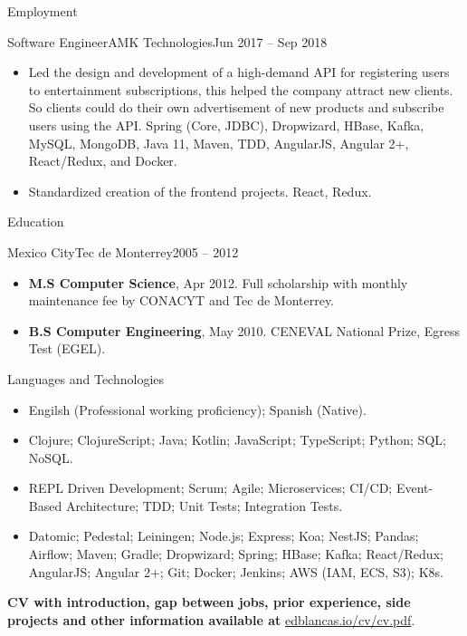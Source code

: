 \documentclass[calibri]{../macdowell-cv/mcdowellcv}
\begin{document}
\begin{cvsection}{Employment}
		\begin{cvsubsection}{Software Engineer}{AMK Technologies}{Jun 2017 -- Sep 2018}
			\begin{itemize}
				\item Led the design and development of a high-demand API for registering users to entertainment subscriptions, this helped the company attract new clients. So clients could do their own advertisement of new products and subscribe users using the API. Spring (Core, JDBC), Dropwizard, HBase, Kafka, MySQL, MongoDB, Java 11, Maven, TDD, AngularJS, Angular 2+, React/Redux, and Docker.
				\item Standardized creation of the frontend projects. React, Redux.
			\end{itemize}
		\end{cvsubsection}
	\end{cvsection}
	
	\begin{cvsection}{Education}
		\begin{cvsubsection}{Mexico City}{Tec de Monterrey}{2005 -- 2012}
			\begin{itemize}
				\item \textbf{M.S Computer Science}, Apr 2012. Full scholarship with monthly maintenance fee by CONACYT and Tec de Monterrey.
				\item \textbf{B.S Computer Engineering}, May 2010. CENEVAL National Prize, Egress Test (EGEL).
			\end{itemize}
		\end{cvsubsection}
	\end{cvsection}
	
	\begin{cvsection}{Languages and Technologies}
		\begin{cvsubsection}{}{}{}	
			\begin{itemize}
				\item Engilsh (Professional working proficiency); Spanish (Native).
				\item Clojure; ClojureScript; Java; Kotlin; JavaScript; TypeScript; Python; SQL; NoSQL.
				\item REPL Driven Development; Scrum; Agile; Microservices; CI/CD; Event-Based Architecture; TDD; Unit Tests; Integration Tests.
				\item Datomic; Pedestal; Leiningen; Node.js; Express; Koa; NestJS; Pandas; Airflow; Maven; Gradle; Dropwizard; Spring; HBase; Kafka; React/Redux; AngularJS; Angular 2+; Git; Docker; Jenkins; AWS (IAM, ECS, S3); K8s.
			\end{itemize}
		\end{cvsubsection}
	\end{cvsection}

	\begin{flushleft}
		\textbf{CV with introduction, gap between jobs, prior experience, side
        projects and other information available at} \href{https://edblancas.io/cv/cv.pdf}{edblancas.io/cv/cv.pdf}.
	\end{flushleft}
	
\end{document}

